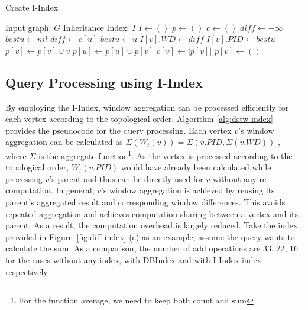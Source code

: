 \begin{algorithm}[h]
\label{alg:piconstruction}
\caption{Create I-Index}
\begin{algorithmic}[1]
\Require Input graph: $G$ 
\Ensure Inheritance Index: $I$ 
\State $I \leftarrow ()$
\State $p \leftarrow ()$ 
\State $c \leftarrow ()$ 
\State $diff \leftarrow -\infty$ 
\State $bestu \leftarrow nil$
 \label{algo:tp-step1-start}
		\State $diff \leftarrow c[u]$
		\State $bestu \leftarrow u$
	\EndIf
\EndFor \label{algo:tp-step1-stop}
\State $I[v].WD \leftarrow diff$
\State $I[v].PID \leftarrow bestu$
\State $p[v] \leftarrow p[v] \cup v$
 \label{algo:tp-step2-start}
	\State $p[u] \leftarrow p[u] \cup p[v]$
\EndFor \label{algo:tp-step2-stop}
\State $c[v] \leftarrow |p[v]|$ 
\State $p[v] \leftarrow ()$ 
\EndFor
\end{algorithmic}
\label{algo:piconstruction}
\end{algorithm}



\subsection{Query Processing using I-Index}
By employing the I-Index, window aggregation can be processed efficiently 
for each vertex according to 
the topological order. Algorithm \ref{alg:dstw-index} 
provides the pseudocode for the query processing. 
Each vertex $v$'s window aggregation can be calculated 
as 
$\Sigma (W_t(v)) = \Sigma (v.PID,\Sigma(v.WD))$
, where $\Sigma$ is the aggregate function\footnote{For the function average, we need to keep both count and sum}. As the vertex is 
processed according to the topological order, $W_t(v.PID)$ 
would have already been calculated while processing $v$'s parent and 
thus can be directly used for $v$ without any re-computation. 
In general, $v$'s window aggregation is achieved by reusing its 
parent's aggregated result and corresponding window differences.
This avoids repeated aggregation and achieves 
computation sharing between a vertex and its parent. 
As a result, the computation overhead is largely reduced. 
Take the index  provided in Figure~\ref{fig:diff-index} (c) as an example, 
assume the query wants to calculate the sum. As a comparison, the number of add operations 
are 33, 22, 16 for the cases without any index, 
with DBIndex and with I-Index index respectively. 



